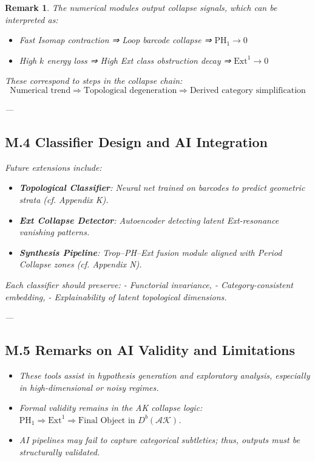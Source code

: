 \documentclass[11pt]{article}
\newtheorem{remark}[theorem]{Remark}
\begin{document}
\begin{remark}
The numerical modules output collapse signals, which can be interpreted as:
\begin{itemize}
  \item Fast Isomap contraction ⇒ Loop barcode collapse ⇒ $\mathrm{PH}_1 \to 0$
  \item High $k$ energy loss ⇒ High Ext class obstruction decay ⇒ $\mathrm{Ext}^1 \to 0$
\end{itemize}

These correspond to steps in the collapse chain:
\[
\text{Numerical trend} \Rightarrow \text{Topological degeneration} \Rightarrow \text{Derived category simplification}
\]

---

\subsection*{M.4 Classifier Design and AI Integration}

Future extensions include:
\begin{itemize}
  \item \textbf{Topological Classifier}: Neural net trained on barcodes to predict geometric strata (cf. Appendix K).
  \item \textbf{Ext Collapse Detector}: Autoencoder detecting latent Ext-resonance vanishing patterns.
  \item \textbf{Synthesis Pipeline}: Trop–PH–Ext fusion module aligned with Period Collapse zones (cf. Appendix N).
\end{itemize}

Each classifier should preserve:
- Functorial invariance,
- Category-consistent embedding,
- Explainability of latent topological dimensions.

---

\subsection*{M.5 Remarks on AI Validity and Limitations}

\begin{itemize}
  \item These tools assist in hypothesis generation and exploratory analysis, especially in high-dimensional or noisy regimes.
  \item Formal validity remains in the AK collapse logic: $\mathrm{PH}_1 \Rightarrow \mathrm{Ext}^1 \Rightarrow \text{Final Object in } D^b(\mathcal{AK})$.
  \item AI pipelines may fail to capture categorical subtleties; thus, outputs must be structurally validated.
\end{itemize}



\end{remark}
\end{document}
